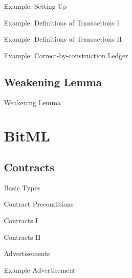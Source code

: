 \documentclass{beamer}
\begin{document}
\begin{frame}{Example: Setting Up}
\UTXOexampleSetup{}
\end{frame}

\begin{frame}{Example: Definitions of Transactions I}
\UTXOexampleAA{}
\end{frame}

\begin{frame}{Example: Definitions of Transactions II}
\UTXOexampleAB{}
\end{frame}

\begin{frame}{Example: Correct-by-construction Ledger}
\UTXOexampleB{}
\end{frame}

\subsection{Weakening Lemma}
\begin{frame}{Weakening Lemma}
\UTXOweakening{}
\end{frame}
  
\section{BitML}

\subsection{Contracts}

\begin{frame}{Basic Types}
\BITbasicTypes{}
\end{frame}

\begin{frame}{Contract Preconditions}
\BITpreconditions{}
\end{frame}

\begin{frame}{Contracts I}
\BITcontractsA{}
\end{frame}

\begin{frame}{Contracts II}
\BITcontractsB{}
\end{frame}

\begin{frame}{Advertisements}
\BITadvertisements{}
\end{frame}

\begin{frame}{Example Advertisement}
\BITexampleAdvertisement{}
\end{frame}
\end{document}
